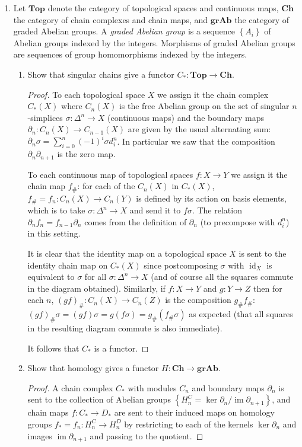 \documentclass[11pt]{article}
\newcommand{\cbr}[1]{\left\{#1\right\}}
\newcommand{\catname}[1]{{\textbf{#1} }}
\newcommand{\Top}{\catname{Top}}
\DeclareMathOperator{\id}{id}
\DeclareMathOperator{\im}{im}
\begin{document}
\begin{enumerate}
    \item Let $\Top$ denote the category of topological spaces and continuous maps, $\catname{Ch}$ the category of chain complexes and chain maps, and $\catname{grAb}$ the category of graded Abelian groups. A \textit{graded Abelian group} is a sequence $\cbr{A_i}$ of Abelian groups indexed by the integers. Morphisms of graded Abelian groups are sequences of group homomorphisms indexed by the integers. \begin{enumerate}
        \item Show that singular chains give a functor $C_\ast\colon \Top\to \catname{Ch}$. \begin{proof}
            To each topological space $X$ we assign it the chain complex $C_\ast(X)$ where $C_n(X)$ is the free Abelian group on the set of singular $n$-simplices $\sigma\colon \Delta^n\to X$ (continuous maps) and the boundary maps $\partial_n\colon C_n(X)\to C_{n-1}(X)$ are given by the usual alternating sum: $\partial_n\sigma = \sum_{i = 0}^n (-1)^i\sigma d_i^n$. In particular we saw that the composition $\partial_n\partial_{n+1}$ is the zero map. 

            To each continuous map of topological spaces $f\colon X\to Y$ we assign it the chain map $f_{\#}$: for each of the $C_n(X)$ in $C_\ast(X)$, $f_{\#}= f_n\colon C_n(X)\to C_n(Y)$ is defined by its action on basis elements, which is to take $\sigma\colon \Delta^n\to X$ and send it to $f\sigma$. The relation $\partial_n f_{n} = f_{n-1}\partial_n$ comes from the definition of $\partial_n$ (to precompose with $d_i^n$) in this setting.

            It is clear that the identity map on a topological space $X$ is sent to the identity chain map on $C_\ast(X)$ since postcomposing $\sigma$ with $\id_X$ is equivalent to $\sigma$ for all $\sigma\colon \Delta^n\to X$ (and of course all the squares commute in the diagram obtained). Similarly, if $f\colon X\to Y$ and $g\colon Y\to Z$ then for each $n$, $(gf)_{\#}\colon C_n(X)\to C_n(Z)$ is the composition $g_{\#}f_{\#}$: $(gf)_{\#}\sigma = (gf)\sigma = g(f\sigma) = g_{\#}(f_{\#}\sigma)$ as expected (that all squares in the resulting diagram commute is also immediate). 

            It follows that $C_\ast$ is a functor.
        \end{proof}
        \item Show that homology gives a functor $H\colon \catname{Ch}\to \catname{grAb}$. \begin{proof}
            A chain complex $C_\ast$ with modules $C_n$ and boundary maps $\partial_n$ is sent to the collection of Abelian groups $\cbr{H_n^C = \ker\partial_n/\im\partial_{n+1}}$, and chain maps $f\colon C_\ast\to D_\ast$ are sent to their induced maps on homology groups $f_\ast = f_n\colon H_n^C\to H_n^D$ by restricting to each of the kernels $\ker\partial_n$ and images $\im\partial_{n+1}$ and passing to the quotient.


\end{proof}
\end{enumerate}
\end{enumerate}
\end{document}
